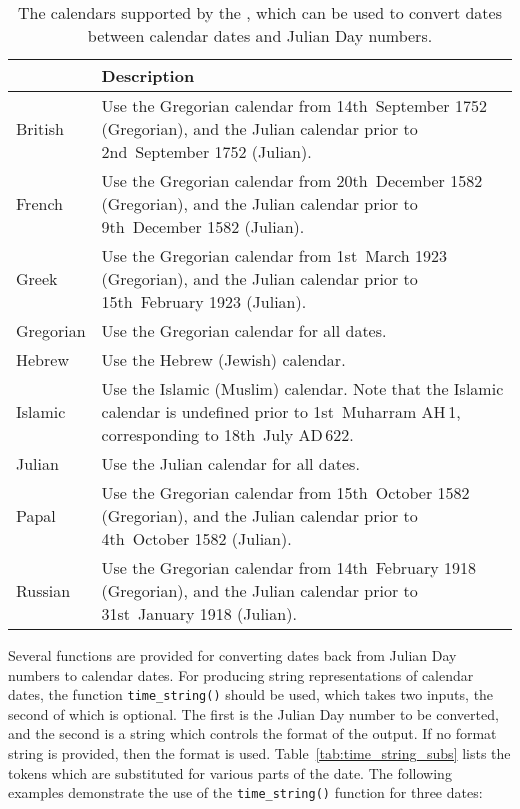 \begin{table}
\begin{center}
\begin{tabular}{|>{\columncolor{LightGrey}}l|>{\columncolor{LightGrey}}p{9cm}|}
\hline
{\bf Calendar} & {\bf Description} \\
\hline
British &
Use the Gregorian calendar from 14th~September 1752 (Gregorian), and the Julian calendar prior to 2nd~September 1752 (Julian). \\
French &
Use the Gregorian calendar from 20th~December 1582 (Gregorian), and the Julian
calendar prior to 9th~December 1582 (Julian). \\
Greek &
Use the Gregorian calendar from 1st~March 1923 (Gregorian), and the Julian
calendar prior to 15th~February 1923 (Julian). \\
Gregorian &
Use the Gregorian calendar for all dates. \\
Hebrew &
Use the Hebrew (Jewish) calendar. \\
Islamic &
Use the Islamic (Muslim) calendar. Note that the Islamic calendar is undefined prior to 1st~Muharram {\footnotesize AH}\,1, corresponding to 18th~July {\footnotesize AD}\,622. \\
Julian &
Use the Julian calendar for all dates. \\
Papal &
Use the Gregorian calendar from 15th~October 1582 (Gregorian), and the Julian
calendar prior to 4th~October 1582 (Julian). \\
Russian &
Use the Gregorian calendar from 14th~February 1918 (Gregorian), and the Julian
calendar prior to 31st~January 1918 (Julian). \\
\hline
\end{tabular}
\end{center}
\caption{The calendars supported by the , which can be
used to convert dates between calendar dates and Julian Day numbers.}
\label{tab:calendars}
\end{table}

Several functions are provided for converting dates back from Julian Day
numbers to calendar dates. For producing string representations of calendar
dates, the function {\tt time\_string()} should be used, which takes two inputs, the second of which is
optional. The first is the Julian Day number to be converted, and the second is
a string which controls the format of the output.  If no format string is
provided, then the format\vspace{3mm}\newline
{}\vspace{3mm}\newline
\noindent is used.  Table~\ref{tab:time_string_subs} lists the tokens which are
substituted for various parts of the date. The following examples demonstrate
the use of the {\tt time\_string()} function for three dates:

